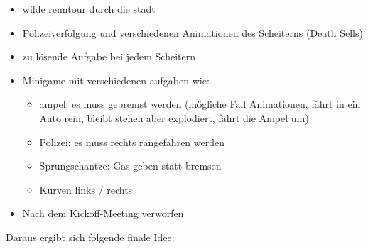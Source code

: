 \begin{enumerate}
	\begin{itemize}
		\item{wilde renntour durch die stadt}
		\item{Polizeiverfolgung und verschiedenen Animationen des Scheiterns (Death Sells)}
		\item{zu lösende Aufgabe bei jedem Scheitern}
		\item{Minigame mit verschiedenen aufgaben wie:}
		\begin{itemize}
			\item{ampel: es muss gebremst werden (mögliche Fail Animationen, fährt in ein Auto rein, bleibt stehen aber explodiert, fährt die Ampel um)}
			\item{Polizei: es muss rechts rangefahren werden}
			\item{Sprungschantze: Gas geben statt bremsen}
			\item{Kurven links / rechts}
		\end{itemize}
		\item{Nach dem Kickoff-Meeting verworfen}
	\end{itemize}
\end{enumerate}
Daraus ergibt sich folgende finale Idee:
